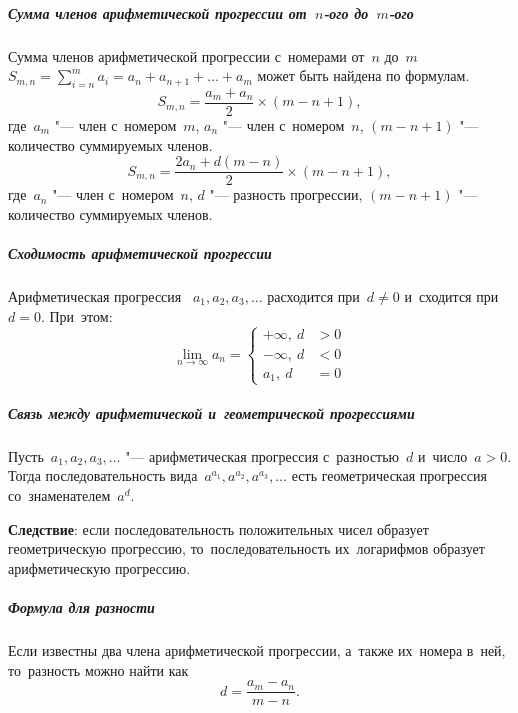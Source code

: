 \documentclass[]{scrartcl}
\begin{document}
\subparagraph{Сумма членов арифметической прогрессии от~${\textstyle n}$-ого до~${\textstyle m}$-ого}
Сумма членов арифметической прогрессии с~номерами от~${\textstyle n}$ до~${\textstyle m}$ ${\textstyle S_{m,n}=\sum_{i=n}^{m}a_{i}=a_{n}+a_{n+1}+\ldots +a_{m}}$  может быть найдена по формулам.
\begin{equation}\label{eq:arithmetic-progression-10}
S_{m,n}={\frac{a_{m}+a_{n}}{2}}\times (m-n+1),
\end{equation}
где~${\textstyle a_{m}}$ "--- член с~номером~${\textstyle m}$, ${\textstyle a_{n}}$ "--- член с~номером~${\textstyle n}$, ${\textstyle (m-n+1)}$ "--- количество суммируемых членов.
\begin{equation}\label{eq:arithmetic-progression-11}
S_{m,n}={\frac{2a_{n}+d(m-n)}{2}}\times (m-n+1),
\end{equation}
где~${\textstyle a_{n}}$ "--- член с~номером~${\textstyle n}$, ${\textstyle d}$ "--- разность прогрессии, ${\textstyle (m-n+1)}$ "--- количество суммируемых членов.
\subparagraph{Сходимость арифметической прогрессии}
Арифметическая прогрессия~ ${\textstyle a_{1},a_{2},a_{3},\ldots}$ расходится при~${\textstyle d\neq 0}$ и~сходится при~${\textstyle d=0}$. При~этом:
\begin{equation}\label{eq:arithmetic-progression-12}
\lim_{n\rightarrow \infty }a_{n}=\left\{{
	\begin{matrix}+\infty ,\ d&>0\\
	-\infty ,\ d&<0\\
	a_{1},\ d&=0
	\end{matrix}}\right.
\end{equation}
\subparagraph{Связь между арифметической и~геометрической прогрессиями}
Пусть~${\textstyle a_{1}, a_{2}, a_{3},\ldots}$ "--- арифметическая прогрессия с~разностью~${\displaystyle d}$ и~число~${\textstyle a>0}$. Тогда последовательность вида~${\textstyle a^{a_{1}},a^{a_{2}},a^{a_{3}},\ldots}$  есть геометрическая прогрессия со~знаменателем~${\textstyle a^{d}}$.

\textbf{Следствие}: если последовательность положительных чисел образует геометрическую прогрессию, то~последовательность их~логарифмов образует арифметическую прогрессию. 

\subparagraph{Формула для разности}
Если известны два члена арифметической прогрессии, а~также их~номера в~ней, то~разность можно найти как
\begin{equation}\label{eq:arithmetic-progression-13}
d={\frac{a_{m}-a_{n}}{m-n}}.
\end{equation}
\end{document}

